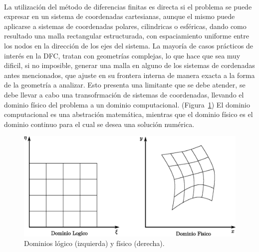 \documentclass[letterpaper, openright, 12pt]{book}
\begin{document}
    \paragraph*{}
    La utilización del método de diferencias finitas es directa si el problema
    se puede expresar en un sistema de coordenadas cartesianas, aunque el mismo
    puede aplicarse a sistemas de coordenadas polares, cilindricas o esféricas,
    dando como resultado una malla rectangular estructurada, con espaciamiento
    uniforme entre los nodos en la dirección de los ejes del sistema. La mayoría
    de casos prácticos de interés en la DFC, tratan con geometrías complejas,
    lo que hace que sea muy dificil, si no imposible, generar una malla en
    alguno de los sistemas de cordenadas antes mencionados, que ajuste en su
    frontera interna de manera exacta a la forma de la geometría a analizar.
    Esto presenta una limitante que se debe atender, se debe llevar a cabo una
    transofrmación de sistemas de coordenadas, llevando el dominio físico del
    problema a un dominio computacional. (Figura~\ref{fig:dominios}) El dominio
    computacional es una abstración matemática, mientras que el dominio físico
    es el dominio continuo para el cual se desea una solución numérica.
    \begin{figure}[htbp!]
        \centering
        \includegraphics[keepaspectratio, width=170mm]{./Imagenes/dominios}
        \caption[Dominios lógico y físico]{Dominios lógico (izquierda) y físico (derecha). \cite{numerical-grid}}
        \label{fig:dominios}
    \end{figure}
\end{document}
